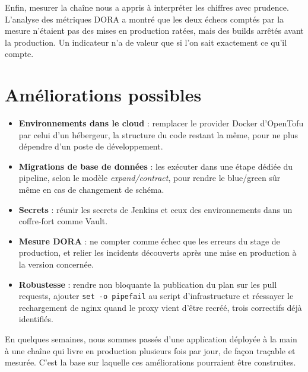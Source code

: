 \documentclass[11pt,a4paper]{report}
\begin{document}
Enfin, mesurer la chaîne nous a appris à interpréter les chiffres avec prudence. L'analyse des métriques DORA a montré que les deux échecs comptés par la mesure n'étaient pas des mises en production ratées, mais des builds arrêtés avant la production. Un indicateur n'a de valeur que si l'on sait exactement ce qu'il compte.

\section*{Améliorations possibles}
\begin{itemize}
  \item \textbf{Environnements dans le cloud} : remplacer le provider Docker d'OpenTofu par celui d'un hébergeur, la structure du code restant la même, pour ne plus dépendre d'un poste de développement.
  \item \textbf{Migrations de base de données} : les exécuter dans une étape dédiée du pipeline, selon le modèle \emph{expand/contract}, pour rendre le blue/green sûr même en cas de changement de schéma.
  \item \textbf{Secrets} : réunir les secrets de Jenkins et ceux des environnements dans un coffre-fort comme Vault.
  \item \textbf{Mesure DORA} : ne compter comme échec que les erreurs du stage de production, et relier les incidents découverts après une mise en production à la version concernée.
  \item \textbf{Robustesse} : rendre non bloquante la publication du plan sur les pull requests, ajouter \texttt{set -o pipefail} au script d'infrastructure et réessayer le rechargement de nginx quand le proxy vient d'être recréé, trois correctifs déjà identifiés.
\end{itemize}

En quelques semaines, nous sommes passés d'une application déployée à la main à une chaîne qui livre en production plusieurs fois par jour, de façon traçable et mesurée. C'est la base sur laquelle ces améliorations pourraient être construites.
\end{document}
